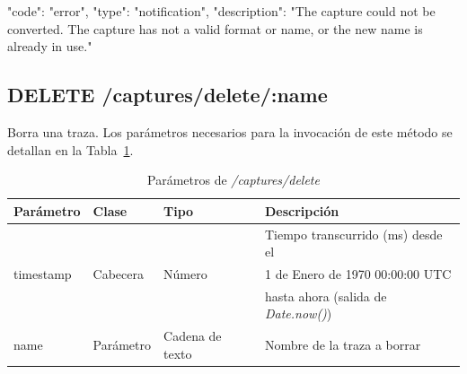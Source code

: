 \begin{itemize}
{\begin{minipage}{\textwidth}
\begin{code}[language=json]
{
  "code": "error",
  "type": "notification",
  "description": "The capture could not be converted. The capture has not a valid format or name, or the new name is already in use."
}
\end{code}
\end{minipage}
}
\end{itemize}

%
%
\subsection{DELETE /captures/delete/:name}
Borra una \gls{traza}.
Los parámetros necesarios para la invocación de este método se detallan en la Tabla~\ref{extra:api:capturesdelete:invocacion}.

\begin{table}[H]
\centering
\begin{tabular}{|l|l|l|l|}
\hline
\rowcolor[HTML]{F5F5F5}
\textbf{Parámetro}  & \textbf{Clase} & \textbf{Tipo}   & \textbf{Descripción}                        \\ \hline
                    &                &                 & Tiempo transcurrido (ms) desde el           \\
timestamp           & Cabecera       & Número          & 1 de Enero de 1970 00:00:00 UTC             \\
                    &                &                 & hasta ahora (salida de \textit{Date.now()}) \\ \hline
name                & Parámetro      & Cadena de texto & Nombre de la \gls{traza} a borrar           \\ \hline
\end{tabular}
\caption{Parámetros de \textit{/captures/delete}}
\label{extra:api:capturesdelete:invocacion}
\end{table}

